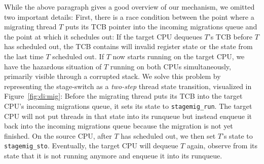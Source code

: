 \documentclass[12pt,a4paper]{book}
\begin{document}
While the above paragraph gives a good overview of our mechanism, we omitted two important details:
First, there is a race condition between the point where a migrating thread $T$ puts its TCB pointer into the incoming migrations queue and the point at which it schedules out:
If the target CPU dequeues $T$'s TCB before $T$ has scheduled out, the TCB contains will invalid register state or the state from the last time $T$ scheduled out.
If $T$ now starts running on the target CPU, we have the hazardous situation of $T$ running on both CPUs simultaneously, primarily visible through a corrupted stack.
We solve this problem by representing the stage-switch as a \emph{two-step} thread state transition, visualized in Figure~\ref{fig:di:mig}:
Before the migrating thread puts its TCB into the target CPU's incoming migrations queue, it sets its state to \lstinline[style=figurecpp]{stagemig_run}.
The target CPU will not put threads in that state into its runqueue but instead enqueue it back into the incoming migrations queue because the migration is not yet finished.
On the source CPU, after $T$ has scheduled out, we then set $T$'s state to \lstinline[style=figurecpp]{stagemig_sto}.
Eventually, the target CPU will dequeue $T$ again, observe from its state that it is not running anymore and enqueue it into its runqueue.
\end{document}
